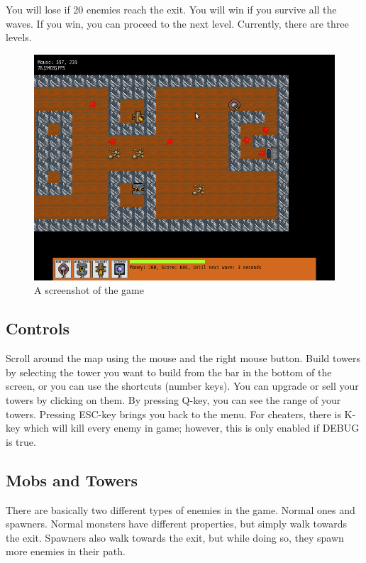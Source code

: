 \documentclass[11pt]{article}
\begin{document}
You will lose if 20 enemies reach the exit. You will win if you
survive all the waves. If you win, you can proceed to the next
level. Currently, there are three levels.

\begin{figure}[ht!]
\centering
\includegraphics[width=\textwidth]{screenshot.png}
\caption{A screenshot of the game}
\label{fig:game}
\end{figure}


\subsection{Controls}
\label{sec-1_2}

Scroll around the map using the mouse and the right mouse
button. Build towers by selecting the tower you want to build from the
bar in the bottom of the screen, or you can use the shortcuts (number
keys). You can upgrade or sell your towers by clicking on them. By
pressing Q-key, you can see the range of your towers. Pressing ESC-key
brings you back to the menu. For cheaters, there is K-key which will
kill every enemy in game; however, this is only enabled if DEBUG is
true.

\subsection{Mobs and Towers}

There are basically two different types of enemies in the game. Normal
ones and spawners. Normal monsters have different properties, but
simply walk towards the exit. Spawners also walk towards the exit, but
while doing so, they spawn more enemies in their path.
\end{document}
